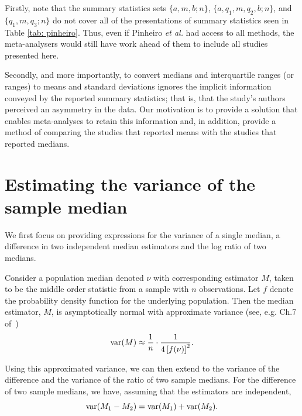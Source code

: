 \documentclass{article}
\begin{document}

Firstly, note that the summary statistics sets $\{a, m, b; n\}$, $\{a, q_1, m, q_2, b; n\}$, and $\{q_1, m, q_3; n\}$ do not cover all of the presentations of summary statistics seen in Table \ref{tab: pinheiro}. Thus, even if Pinheiro \emph{et al.} had access to all methods, the meta-analysers would still have work ahead of them to include all studies presented here.

Secondly, and more importantly, to convert medians and interquartile ranges (or ranges) to means and standard deviations ignores the implicit information conveyed by the reported summary statistics; that is, that the study's authors perceived an asymmetry in the data. Our motivation is to provide a solution that enables meta-analyses to retain this information and, in addition, provide a method of comparing the studies that reported means with the studies that reported medians.

\section{Estimating the variance of the sample median} \label{sec: est}

We first focus on providing expressions for the variance of a single median, a difference in two independent median estimators and the log ratio of two medians.

Consider a population median denoted $\nu$ with corresponding estimator $M$, taken to be the middle order statistic from a sample with $n$ observations.  Let $f$ denote the probability density function for the underlying population.  Then the median estimator, $M$, is asymptotically normal with approximate variance (see, e.g. Ch.7 of~\cite{dasgupta2008asymptotic})
\begin{equation}\label{eqn: var est}
\operatorname{var}(M)\approx \frac{1}{n}\cdot\frac{1}{4\left[f(\nu)\right]^2}.
\end{equation}


Using this approximated variance, we can then extend to the variance of the difference and the variance of the ratio of two sample medians. For the difference of two sample medians, we have, assuming that the estimators are independent,
\begin{equation}\label{eqn: var diff}
\operatorname{var}(M_1-M_2) = \operatorname{var}(M_1) + \operatorname{var}(M_2).
\end{equation}
\end{document}
